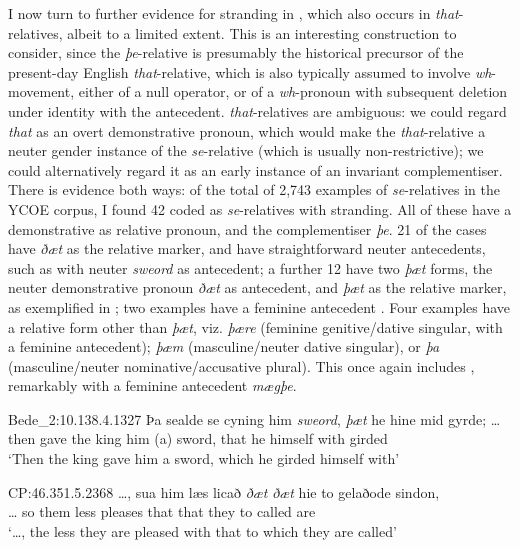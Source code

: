 \documentclass[output=paper]{langsci/langscibook}
\begin{document}
I now turn to further evidence for stranding in , which also occurs
in \textit{that}-relatives, albeit to a limited extent. This is an interesting
construction to consider, since the \textit{þe}-relative is presumably the
historical precursor of the present-day English \textit{that}-relative, which
is also typically assumed to involve \textit{wh}-movement, either of a null
operator, or of a \textit{wh}-pronoun with subsequent deletion under identity
with the antecedent.  \textit{that}-relatives are ambiguous: we
could regard \textit{that} as an overt demonstrative pronoun, which would make
the \textit{that}-relative a neuter gender instance of the \textit{se}-relative
(which is usually non-restrictive); we could alternatively regard it as an
early instance of an invariant complementiser. There is evidence both ways: of
the total of 2,743 examples of \textit{se}-relatives in the YCOE corpus, I
found 42 coded as \textit{se}-relatives with stranding. All of these have a
demonstrative as relative pronoun, and the complementiser \textit{þe}.  21 of
the cases have \textit{ðæt} as the relative marker, and have straightforward
neuter antecedents, such as  with neuter \textit{sweord} as
antecedent; a further 12 have two \textit{þæt} forms, the neuter demonstrative
pronoun \textit{ðæt} as antecedent, and \textit{þæt} as the relative marker, as
exemplified in ; two examples have a feminine antecedent
. Four examples have a relative form other than \textit{þæt},
viz.  \textit{þære} (feminine genitive/dative singular, with a feminine
antecedent); \textit{þæm} (masculine/neuter dative singular), or \textit{þa}
(masculine/neuter nominative/accusative plural). This once again includes
, remarkably with a feminine antecedent
\textit{mægþe}.

\ea Bede\_2:10.138.4.1327%
    \label{ex:key:11.9b}
    \sn
    \gll  Þa     sealde se  cyning him  {}    \textit{sweord}, \textit{þæt} he hine      mid  gyrde; …  \\
        then gave   the king    him (a) sword,   that he himself with girded\\
    \glt ‘Then the king gave him a sword, which he girded himself with’
\z

\ea CP:46.351.5.2368%
    \label{ex:key:11.10}
    \sn
    \gll …, sua him læs    licað    \textit{ðæt} \textit{ðæt} hie  to   gelaðode sindon, \\
        …  so   them less pleases that that they to called      are\\
    \glt `…, the less they are pleased with that to which they are called’
\z
\end{document}

